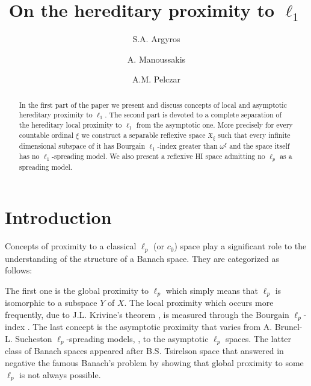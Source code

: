 \documentclass[a4paper]{amsart}
\theoremstyle{plain}
\begin{document}
\title{On the hereditary proximity to $\ell_1$ }
\author{S.A. Argyros}

\address{Department of Mathematics, National Technical University of Athens, Athens 15780, Greece}
\author{A. Manoussakis}
\address{Department of Mathematics, University of Aegean, Karlovasi, Greece}
\author{A.M. Pelczar}
\address{Institute of Mathematics, Jagiellonian University, {\L}ojasiewicza 6, 30-348 Krak\'ow, Poland}
\begin{abstract}
In the first part of the paper we present and discuss
concepts of local and asymptotic hereditary proximity to
$\ell_1$. The second part is devoted to a complete separation of
the hereditary local proximity to $\ell_1$ from the asymptotic one. More
precisely for every countable ordinal $\xi$ we construct a
separable reflexive space $\mathfrak{X}_{\xi}$ such that every
infinite dimensional subspace of it has  Bourgain $\ell_1$-index
greater than $\omega^\xi$ and the space itself has no $\ell_1$-spreading model.  We also present a reflexive HI space admitting
no $\ell_{p}$ as a spreading model.
\end{abstract}
\maketitle

\section{Introduction}
Concepts of proximity to a classical $\ell_p$ (or $c_0$) space play a significant
role to the understanding of the structure of a Banach space. They are categorized as
follows:

The first one is the global proximity to $\ell_p$ which simply means that $\ell_{p}$  is
isomorphic to a subspace  $Y$ of $X$. The local proximity which occurs more frequently,
due to  J.L. Krivine's theorem \cite{K},  is measured through the Bourgain
$\ell_{p}$-index \cite{B}. The last concept is the asymptotic proximity that varies from
A. Brunel-L. Sucheston $\ell_p$-spreading models, \cite{BS}, to the asymptotic $\ell_p$ spaces.
The latter class of Banach spaces appeared after B.S. Tsirelson space \cite{T}  that
answered in negative the famous Banach's problem by showing that global proximity to some
$\ell_p$ is not always possible.
\end{document}
